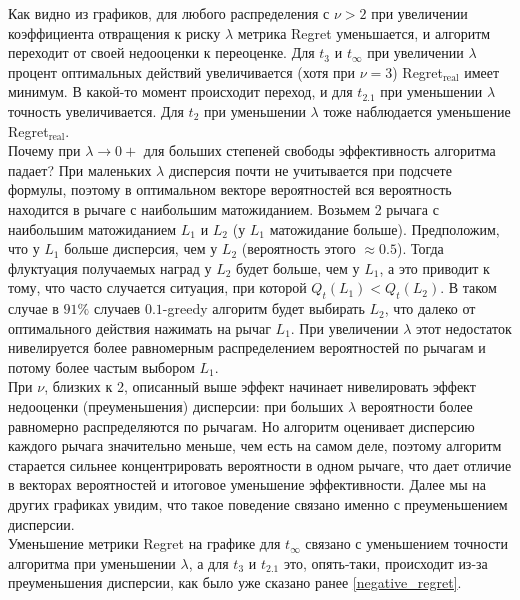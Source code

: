 \documentclass{article}
\begin{document}
Как видно из графиков, для любого распределения с $\nu > 2$ при увеличении коэффициента отвращения к риску $\lambda$ метрика Regret уменьшается, и алгоритм переходит от своей недооценки к переоценке. Для $t_3$ и $t_{\infty}$ при увеличении $\lambda$ процент оптимальных действий увеличивается (хотя при $\nu = 3$) Regret$_\text{real}$ имеет минимум. В какой-то момент происходит переход, и для $t_{2.1}$ при уменьшении $\lambda$ точность увеличивается. Для $t_2$ при уменьшении $\lambda$ тоже наблюдается уменьшение Regret$_\text{real}$. \\

Почему при $\lambda \to 0+$ для больших степеней свободы эффективность алгоритма падает? При маленьких $\lambda$ дисперсия почти не учитывается при подсчете формулы, поэтому в оптимальном векторе вероятностей вся вероятность находится в рычаге с наибольшим матожиданием. Возьмем 2 рычага с наибольшим матожиданием $L_1$ и $L_2$ (у $L_1$ матожидание больше). Предположим, что у $L_1$ больше дисперсия, чем у $L_2$ (вероятность этого $\approx 0.5$). Тогда флуктуация получаемых наград у $L_2$ будет больше, чем у $L_1$, а это приводит к тому, что часто случается ситуация, при которой $Q_t(L_1) < Q_t(L_2)$. В таком случае в $91\%$ случаев $0.1$-greedy алгоритм будет выбирать $L_2$, что далеко от оптимального действия нажимать на рычаг $L_1$. При увеличении $\lambda$ этот недостаток нивелируется более равномерным распределением вероятностей по рычагам и потому более частым выбором $L_1$. \\

При $\nu$, близких к 2, описанный выше эффект начинает нивелировать эффект недооценки (преуменьшения) дисперсии: при больших $\lambda$ вероятности более равномерно распределяются по рычагам. Но алгоритм оценивает дисперсию каждого рычага значительно меньше, чем есть на самом деле, поэтому алгоритм старается сильнее концентрировать вероятности в одном рычаге, что дает отличие в векторах вероятностей и итоговое уменьшение эффективности. Далее мы на других графиках увидим, что такое поведение связано именно с преуменьшением дисперсии. \\

Уменьшение метрики Regret на графике для $t_{\infty}$ связано с уменьшением точности алгоритма при уменьшении $\lambda$, а для $t_{3}$ и $t_{2.1}$ это, опять-таки, происходит из-за преуменьшения дисперсии, как было уже сказано ранее \ref{negative_regret}. \\
\end{document}

